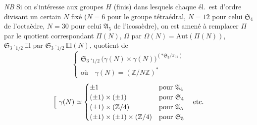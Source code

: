 \documentclass[11pt,a4paper]{article}
\begin{document}
\emph{NB} Si on s'intéresse aux groupes $H$ (finis) dans lesquels chaque él.\ est d'ordre  divisant un certain $N$ fixé ($N = 6$ pour le groupe tétraédral, $N = 12$ pour celui $\mathfrak{S}_4$ de l'octaèdre, $N = 30$ pour celui $\mathfrak{A}_5$ de l'icosaèdre), on est amené à remplacer $\Pi$ par le quotient correspondant $\Pi(N)$, $\Omega$ par $\Omega(N) = \mathrm{Aut}(\Pi(N))$,  $\mathfrak{S}_3 \cdot_{1/2} \mathbb{E}\mathrm{l}$ par $\mathfrak{S}_3 \cdot_{1/2} \mathbb{E}\mathrm{l}(N)$, quotient de 
\[
  \left\lbrace
  \begin{array}{l}
    \mathfrak{S}_3 \cdot_{1/2} \bigl(\gamma(N) \times \gamma(N)\bigr)^{(*\mathfrak{S}_3/\pi_{01})} \\[3pt]
    \text{où} \quad \gamma(N) = (\mathbb{Z}/N\mathbb{Z})^{*}
  \end{array}
  \right.
\]
\[
  \Bigl[\ \gamma(N) \simeq
  \begin{cases}
    \pm 1 & \text{pour } \mathfrak{A}_4 \\
    (\pm 1) \times (\pm 1) & \text{pour } \mathfrak{S}_4 \\
    (\pm 1) \times (\mathbb{Z}/4) & \text{pour } \mathfrak{A}_5 \\
    (\pm 1) \times (\pm 1) \times (\mathbb{Z}/4) & \text{pour } \mathfrak{S}_5
  \end{cases}
  \quad \text{etc.}
\]
\end{document}
